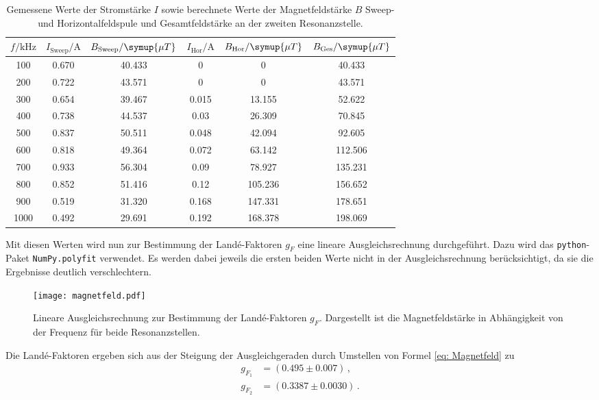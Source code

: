 \FloatBarrier
\noindent
\FloatBarrier
\begin{table}[h]
    \centering
    \caption{Gemessene Werte der Stromstärke $I$ sowie berechnete Werte der Magnetfeldstärke $B$ Sweep- und Horizontalfeldspule und Gesamtfeldstärke an der zweiten Resonanzstelle.}
    \label{tab:atab2}
    \begin{tabular}{c c c c c c}
        \toprule
        {$f / \text{kHz}$} & {$I_{\text{Sweep}} / \text{A}$} & {$B_{\text{Sweep}} / \symup{\mu T}$} & {$I_{\text{Hor}} / \text{A}$} & {$B_{\text{Hor}} / \symup{\mu T}$} & {$B_{\text{Ges}} / \symup{\mu T}$} \\
        \midrule
        100  & 0.670 & 40.433 & 0     & 0       & 40.433 \\
        200  & 0.722 & 43.571 & 0     & 0       & 43.571 \\
        300  & 0.654 & 39.467 & 0.015 & 13.155  & 52.622 \\
        400  & 0.738 & 44.537 & 0.03  & 26.309  & 70.845 \\
        500  & 0.837 & 50.511 & 0.048 & 42.094  & 92.605 \\
        600  & 0.818 & 49.364 & 0.072 & 63.142  & 112.506 \\
        700  & 0.933 & 56.304 & 0.09  & 78.927  & 135.231 \\
        800  & 0.852 & 51.416 & 0.12  & 105.236 & 156.652 \\
        900  & 0.519 & 31.320 & 0.168 & 147.331 & 178.651 \\
        1000 & 0.492 & 29.691 & 0.192 & 168.378 & 198.069 \\
        \bottomrule
    \end{tabular}
\end{table}
\FloatBarrier
\noindent
Mit diesen Werten wird nun zur Bestimmung der Landé-Faktoren $g_F$ eine lineare Ausgleichsrechnung durchgeführt.
Dazu wird das \texttt{python}-Paket \texttt{NumPy.polyfit} verwendet. Es werden dabei jeweils die ersten beiden Werte
nicht in der Ausgleichsrechnung berücksichtigt, da sie die Ergebnisse deutlich verschlechtern. 
\FloatBarrier
\begin{figure}[h]
    \centering
    \texttt{[image: magnetfeld.pdf]}
    \caption{Lineare Ausgleichsrechnung zur Bestimmung der Landé-Faktoren $g_F$. Dargestellt ist die Magnetfeldstärke in Abhängigkeit von der Frequenz für beide Resonanzstellen.}
    \label{fig:afig1}
\end{figure}
\FloatBarrier
\noindent
Die Landé-Faktoren ergeben sich aus der Steigung der Ausgleichgeraden durch Umstellen von Formel \eqref{eq: Magnetfeld} zu
\begin{align*}
    g_{F_1} &= (0.495 \pm 0.007) \, ,\\
    g_{F_2} &= (0.3387  \pm 0.0030) \, .
\end{align*}

